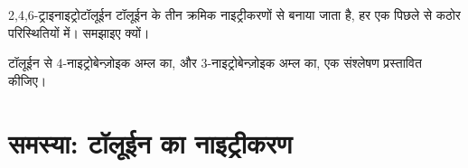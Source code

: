 \begin{exercise}[$\star\star\star$]\label{exo:b2:aromatic-substitution:11}
2,4,6-ट्राइनाइट्रोटॉलूईन टॉलूईन के तीन क्रमिक नाइट्रीकरणों से बनाया जाता है, हर एक पिछले से कठोर
परिस्थितियों में। समझाइए क्यों।
\end{exercise}

\begin{exercise}[$\star\star\star$]\label{exo:b2:aromatic-substitution:12}
टॉलूईन से 4-नाइट्रोबेन्ज़ोइक अम्ल का, और 3-नाइट्रोबेन्ज़ोइक अम्ल का, एक संश्लेषण प्रस्तावित कीजिए।
\end{exercise}

\section{समस्या: टॉलूईन का नाइट्रीकरण}


